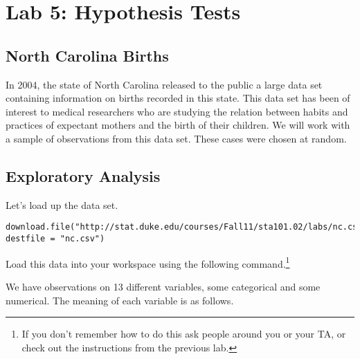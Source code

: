 \documentclass[11pt]{article}
\begin{document}
\section*{Lab 5: Hypothesis Tests}


\subsection*{North Carolina Births}
In 2004, the state of North Carolina released to the public a large data set containing information on births recorded in this state.  This data set has been of interest to medical researchers who are studying the relation between habits and practices of expectant mothers and the birth of their children. We will work with a sample of observations from this data set.  These cases were chosen at random.

\subsection*{Exploratory Analysis}
Let's load up the  data set.

\begin{lstlisting}
download.file("http://stat.duke.edu/courses/Fall11/sta101.02/labs/nc.csv", destfile = "nc.csv")
\end{lstlisting}

Load this data into your workspace using the following command.\footnote{If you don't remember how to do this ask people around you or your TA, or check out the instructions from the previous lab.}

We have observations on 13 different variables, some categorical and some numerical.  The meaning of each variable is as follows.
\end{document}
